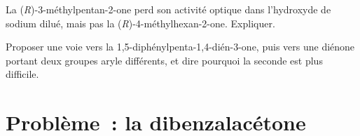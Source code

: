 \begin{exercise}[$\star\star\star$]\label{exo:b2:enolates-aldol:11}
La (\textit{R})-3-méthylpentan-2-one perd son activité optique dans l'hydroxyde de sodium dilué, mais
pas la (\textit{R})-4-méthylhexan-2-one. Expliquer.
\end{exercise}

\begin{exercise}[$\star\star\star$]\label{exo:b2:enolates-aldol:12}
Proposer une voie vers la 1,5-diphénylpenta-1,4-dién-3-one, puis vers une diénone portant deux groupes
aryle différents, et dire pourquoi la seconde est plus difficile.
\end{exercise}

\section{Problème~: la dibenzalacétone}

